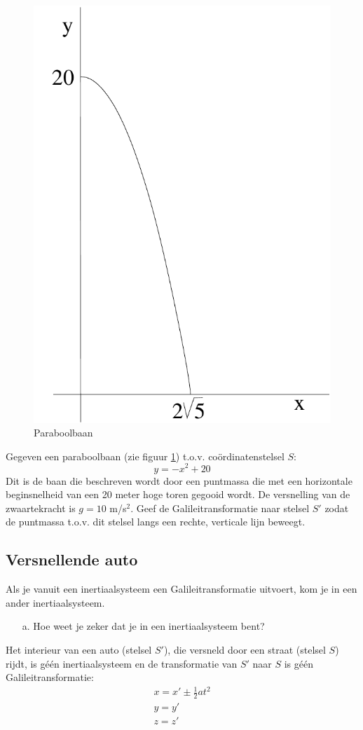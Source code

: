 
\begin{figure}[ht]
\centering
\includegraphics[width=.5\textwidth]{oefeningen.pictures/parabool}
\caption{Paraboolbaan}
\label{f:parabool}
\end{figure}


Gegeven een paraboolbaan (zie figuur \ref{f:parabool}) t.o.v.
co\"{o}rdinatenstelsel $S$:
\begin{displaymath}
y = -x^{2} + 20
\end{displaymath}
Dit is de baan die beschreven wordt door een puntmassa die met een
horizontale beginsnelheid van een 20 meter hoge toren gegooid wordt.
De versnelling van de zwaartekracht is $g = 10$ m/s$^{2}$.
Geef de Galileitransformatie naar stelsel $S'$ zodat de puntmassa t.o.v. dit
stelsel langs een rechte, verticale lijn beweegt.

\subsection{Versnellende auto}
Als  je  vanuit  een  inertiaalsysteem  een Galileitransformatie uitvoert, 
kom je in een ander inertiaalsysteem.
\begin{itemize}
\item [a.]
Hoe weet je zeker dat je in een inertiaalsysteem bent?
\end{itemize}
Het  interieur van een auto (stelsel $S'$), die versneld door een straat 
(stelsel $S$) rijdt, is g\'{e}\'{e}n  
inertiaalsysteem  en  de transformatie van $S'$ naar $S$ is g\'{e}\'{e}n
Galileitransformatie:    
\begin{eqnarray}
\label{v:auto}
x = x' \pm \frac{1}{2} at^{2}  \\
y = y'  \\
z = z'
\end{eqnarray}

